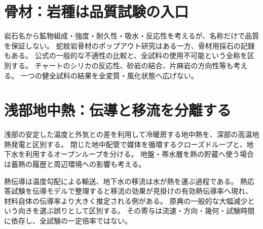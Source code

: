 \section{骨材：岩種は品質試験の入口}\label{theory:engineering:aggregate}
岩石名から鉱物組成・強度・耐久性・吸水・反応性を考えるが、名称だけで品質を保証しない。
蛇紋岩骨材のポップアウト研究はある一方、骨材用採石の記録もある。
公式の一般的な不適性の比較と、全試料の使用不可能という全称を区別する。\cite{eng52_serpent_aggregate,eng52_popout}
チャートのシリカの反応性、砂岩の結合、片麻岩の方向性等も考える。
一つの健全試料の結果を全変質・風化状態へ広げない。

\section{浅部地中熱：伝導と移流を分離する}\label{theory:engineering:groundheat}
浅部の安定した温度と外気との差を利用して冷暖房する地中熱を、深部の高温地熱発電と区別する。
閉じた地中配管で媒体を循環するクローズドループと、地下水を利用するオープンループを分ける。
地盤・帯水層を熱の貯蔵へ使う場合は蓄熱の履歴と周辺環境への影響も考える。\cite{eng52_groundheat_ref}

熱伝導は温度勾配による輸送、地下水の移流は水が熱を運ぶ過程である。
熱応答試験を伝導モデルで整理すると移流の効果が見掛けの有効熱伝導率へ現れ、
材料自体の伝導率より大きく推定される例がある。\cite{eng52_heat_advection}
原典の一般的な大幅減少という向きを選ぶ誤りとして区別する。
その寄与は流速・方向・幾何・試験時間に依存し、全試験の一定倍率ではない。
